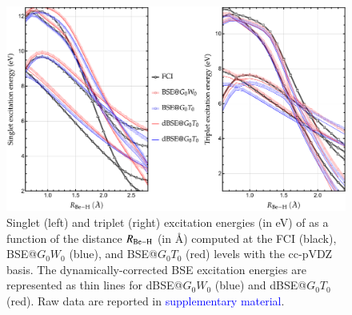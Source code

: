 \documentclass[aip,jcp,reprint,noshowkeys,superscriptaddress]{revtex4-1}
\newcommand{\SupMat}{\textcolor{blue}{supplementary material}}
\begin{document}
\begin{figure}[t]
	\includegraphics[width=\textwidth]{fig4}
	\caption{Singlet (left) and triplet (right) excitation energies (in \si{\eV}) of  as a function of the distance $R_{\ce{Be-H}}$ (in \si{\angstrom}) computed at the FCI (black), BSE@$G_0W_0$ (blue), and BSE@$G_0T_0$ (red) levels with the cc-pVDZ basis.
	The dynamically-corrected BSE excitation energies are represented as thin lines for dBSE@$G_0W_0$ (blue) and dBSE@$G_0T_0$ (red).
	Raw data are reported in {\SupMat}.}
	\label{fig:BeH2}
\end{figure}
\end{document}
